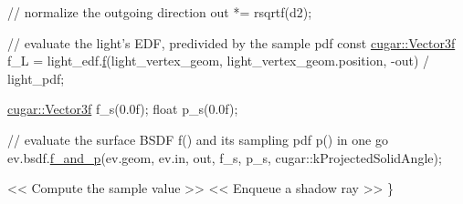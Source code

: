 \begin{DoxyParagraph}{}
\begin{DoxyCode}
    \textcolor{comment}{// normalize the outgoing direction}
    out *= rsqrtf(d2);
    
    \textcolor{comment}{// evaluate the light's EDF, predivided by the sample pdf}
    \textcolor{keyword}{const} \hyperlink{structcugar_1_1_vector}{cugar::Vector3f} f\_L = light\_edf.\hyperlink{structcugar_1_1_lambert_edf_aed2fed71aa6a7ad98e05714a0fd5f316}{f}(light\_vertex\_geom, light\_vertex\_geom.position, 
      -out) / light\_pdf;

    \hyperlink{structcugar_1_1_vector}{cugar::Vector3f} f\_s(0.0f);
    \textcolor{keywordtype}{float}           p\_s(0.0f);
    
    \textcolor{comment}{// evaluate the surface BSDF f() and its sampling pdf p() in one go}
    ev.bsdf.\hyperlink{struct_bsdf_af1ad14ad4a31c7604581a551c3fb1901}{f\_and\_p}(ev.geom, ev.in, out, f\_s, p\_s, cugar::kProjectedSolidAngle);
    
    << Compute the sample value >>
    << Enqueue a shadow ray >>
\}
\end{DoxyCode}

\end{DoxyParagraph}
